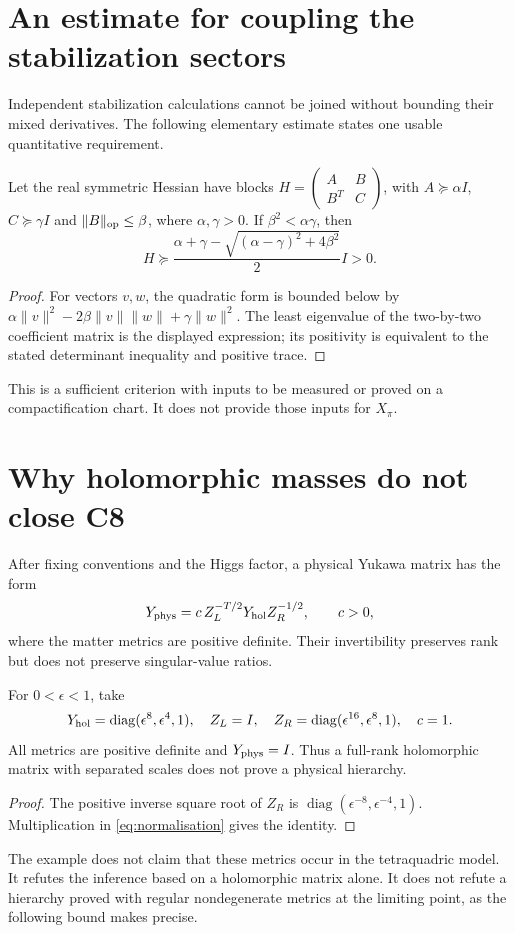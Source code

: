 \section{An estimate for coupling the stabilization sectors}\label{sec:blocks}
Independent stabilization calculations cannot be joined without bounding
their mixed derivatives. The following elementary estimate states one
usable quantitative requirement.
\begin{proposition}\label{prop:blockhessian}
Let the real symmetric Hessian have blocks
$H=\left(\begin{smallmatrix}A&B\\B^T&C\end{smallmatrix}\right)$,
with $A\succeq\alpha I$, $C\succeq\gamma I$ and
$\|B\|_{\rm op}\le\beta$, where $\alpha,\gamma>0$.
If $\beta^2<\alpha\gamma$, then
\[
 H\succeq\frac{\alpha+\gamma-
 \sqrt{(\alpha-\gamma)^2+4\beta^2}}2 I>0.
\]
\end{proposition}
\begin{proof}
For vectors $v,w$, the quadratic form is bounded below by
$\alpha\|v\|^2-2\beta\|v\|\|w\|+\gamma\|w\|^2$.
The least eigenvalue of the two-by-two coefficient matrix is the
displayed expression; its positivity is equivalent to the stated
determinant inequality and positive trace.
\end{proof}
This is a sufficient criterion with inputs to be measured or proved on
a compactification chart. It does not provide those inputs for $X_\pi$.


\section{Why holomorphic masses do not close C8}
After fixing conventions and the Higgs factor, a physical Yukawa matrix
has the form
\begin{equation}\label{eq:normalisation}
 Y_{\rm phys}=c\,Z_L^{-T/2}Y_{\rm hol}Z_R^{-1/2},
 \qquad c>0,
\end{equation}
where the matter metrics are positive definite. Their invertibility
preserves rank but does not preserve singular-value ratios.

\begin{proposition}\label{prop:normalisation}
For $0<\epsilon<1$, take
\[
Y_{\rm hol}=\operatorname{diag}(\epsilon^8,\epsilon^4,1),\quad
Z_L=I,\quad Z_R=\operatorname{diag}(\epsilon^{16},\epsilon^8,1),\quad c=1.
\]
All metrics are positive definite and $Y_{\rm phys}=I$. Thus a full-rank
holomorphic matrix with separated scales does not prove a physical hierarchy.
\end{proposition}
\begin{proof}
The positive inverse square root of $Z_R$ is
$\operatorname{diag}(\epsilon^{-8},\epsilon^{-4},1)$. Multiplication in
\eqref{eq:normalisation} gives the identity.
\end{proof}
The example does not claim that these metrics occur in the tetraquadric
model. It refutes the inference based on a holomorphic matrix alone.
It does not refute a hierarchy proved with regular nondegenerate metrics
at the limiting point, as the following bound makes precise.

